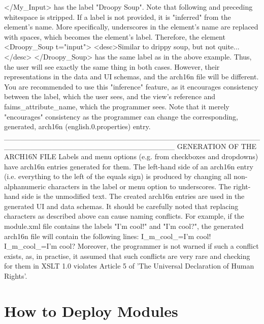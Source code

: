 </My_Input>\crlf
has the label "Droopy Soup". Note that following and preceding whitespace is\crlf
stripped.\crlf
\crlf
If a label is not provided, it is "inferred" from the element's name. More\crlf
specifically, underscores in the element's name are replaced with spaces,\crlf
which becomes the element's label. Therefore, the element\crlf
<Droopy_Soup t="input">\crlf
<desc>Similar to drippy soup, but not quite...</desc>\crlf
</Droopy_Soup>\crlf
has the same label as in the above example. Thus, the user will see exactly\crlf
the same thing in both cases. However, their representations in the data and\crlf
UI schemas, and the arch16n file will be different.\crlf
\crlf
You are recommended to use this "inference" feature, as it encourages\crlf
consistency between the label, which the user sees, and the view's reference\crlf
and faims_attribute_name, which the programmer sees. Note that it merely\crlf
"encourages" consistency as the programmer can change the corresponding,\crlf
generated, arch16n (english.0.properties) entry.\crlf
________________________________________________________________________________\crlf
\crlf
GENERATION OF THE ARCH16N FILE\crlf
\crlf
Labels and menu options (e.g. from checkboxes and dropdowns) have arch16n\crlf
entries generated for them. The left-hand side of an arch16n entry (i.e.\crlf
everything to the left of the equals sign) is produced by changing all\crlf
non-alphanumeric characters in the label or menu option to underscores. The\crlf
right-hand side is the unmodified text.\crlf
\crlf
The created arch16n entries are used in the generated UI and data schemas.\crlf
\crlf
It should be carefully noted that replacing characters as described above can\crlf
cause naming conflicts. For example, if the module.xml file contains the\crlf
labels "I'm cool!" and "I'm cool?", the generated arch16n file will contain\crlf
the following lines:\crlf
I_m_cool_=I'm cool!\crlf
I_m_cool_=I'm cool?\crlf
Moreover, the programmer is not warned if such a conflict exists, as, in\crlf
practise, it assumed that such conflicts are very rare and checking for them\crlf
in XSLT 1.0 violates Article 5 of 'The Universal Declaration of Human Rights'.

\section[section-6]{\crlf
}

\section[how-to-deploy-modules]{How to Deploy Modules}

